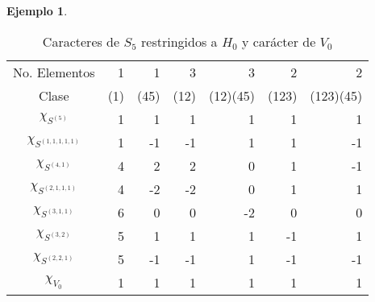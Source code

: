 \documentclass[12pt]{book}
\theoremstyle{definition}
\newtheorem{example}[theorem]{Ejemplo}
\newcounter{in}
\begin{document}
\begin{example}
\begin{table}[!hbtp]
  \centering
    \begin{tabular}{c |r r r r r r}
      No. Elementos& 1 & 1 & 3 & 3 & 2 & 2 \\
      Clase & (1) & (45) & (12) & (12)(45) & (123) & (123)(45) \\
      \hline
      $\chi_{S^{(5)}}$       & 1 & 1 & 1 & 1 & 1 & 1 \\
      $\chi_{S^{(1,1,1,1,1)}}$ & 1 & -1 & -1 & 1 & 1 & -1 \\
      $\chi_{S^{(4,1)}}$      & 4 & 2 & 2 & 0 & 1 & -1 \\
      $\chi_{S^{(2,1,1,1)}}$   & 4 & -2 & -2 & 0 & 1 & 1 \\
      $\chi_{S^{(3,1,1)}}$     & 6 & 0 & 0 & -2 & 0 & 0 \\
      $\chi_{S^{(3,2)}}$      & 5 & 1 & 1 & 1 & -1 & 1 \\
      $\chi_{S^{(2,2,1)}}$    & 5 & -1 & -1 & 1 & -1 & -1 \\
      \hline
      $\chi_{V_{0}}$ & 1 & 1 & 1 & 1 & 1 & 1 \\
    \end{tabular}

\caption{Caracteres de $S_{5}$ restringidos a $H_{0}$ y carácter de $V_{0}$}
\label{tab:restriccion-H_0}
\end{table}


\end{example}
\end{document}
